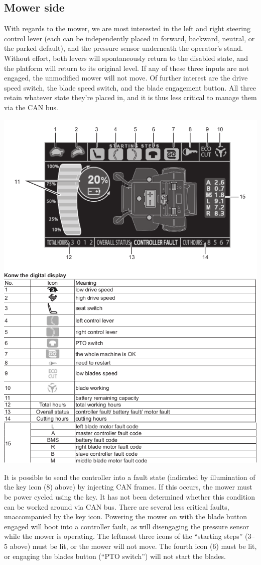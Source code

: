 \documentclass[letterpaper,10pt]{article}
\begin{document}
\subsection{Mower side}
With regards to the mower, we are most interested in the left and right steering
control lever (each can be independently placed in forward, backward, neutral,
or the parked default), and the pressure sensor underneath the operator's stand.
Without effort, both levers will spontaneously return to the disabled state,
and the platform will return to its original level. If any of these three inputs
are not engaged, the unmodified mower will not move. Of further interest are
the drive speed switch, the blade speed switch, and the blade engagement button.
All three retain whatever state they're placed in, and it is thus less critical
to manage them via the CAN bus.
\begin{center}
\includegraphics[width=.9\linewidth]{mowerdisplay.png}
\end{center}
It is possible to send the controller into a fault state (indicated by illumination
of the key icon (8) above) by injecting CAN frames. If this occurs, the mower
must be power cycled using the key. It has not been determined whether this
condition can be worked around via CAN bus. There are several less critical
faults, unaccompanied by the key icon. Powering the mower on with the blade
button engaged will boot into a controller fault, as will disengaging the
pressure sensor while the mower is operating. The leftmost three icons of the
``starting steps'' (3--5 above) must be lit, or the mower will not move. The
fourth icon (6) must be lit, or engaging the blades button (``PTO switch'')
will not start the blades.
\end{document}
